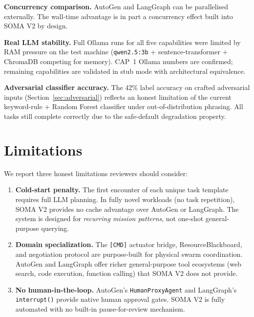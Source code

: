 \documentclass[conference]{IEEEtran}
\begin{document}
\textbf{Concurrency comparison.} AutoGen and LangGraph can be parallelised externally.
The wall-time advantage is in part a concurrency effect built into SOMA V2 by design.

\textbf{Real LLM stability.} Full Ollama runs for all five capabilities were limited
by RAM pressure on the test machine (\texttt{qwen2.5:3b} + sentence-transformer +
ChromaDB competing for memory). CAP~1 Ollama numbers are confirmed; remaining
capabilities are validated in stub mode with architectural equivalence.

\textbf{Adversarial classifier accuracy.} The 42\% label accuracy on crafted adversarial
inputs (Section~\ref{sec:adversarial}) reflects an honest limitation of the current
keyword-rule + Random Forest classifier under out-of-distribution phrasing. All tasks
still complete correctly due to the safe-default degradation property.


\section{Limitations}

We report three honest limitations reviewers should consider:

\begin{enumerate}
  \item \textbf{Cold-start penalty.} The first encounter of each unique task template
        requires full LLM planning. In fully novel workloads (no task repetition), SOMA V2
        provides no cache advantage over AutoGen or LangGraph. The system is designed for
        \emph{recurring mission patterns}, not one-shot general-purpose querying.
  \item \textbf{Domain specialization.} The \texttt{[CMD]} actuator bridge, ResourceBlackboard,
        and negotiation protocol are purpose-built for physical swarm coordination. AutoGen
        and LangGraph offer richer general-purpose tool ecosystems (web search, code
        execution, function calling) that SOMA V2 does not provide.
  \item \textbf{No human-in-the-loop.} AutoGen's \texttt{HumanProxyAgent} and LangGraph's
        \texttt{interrupt()} provide native human approval gates. SOMA V2 is fully automated
        with no built-in pause-for-review mechanism.
\end{enumerate}

\end{document}

